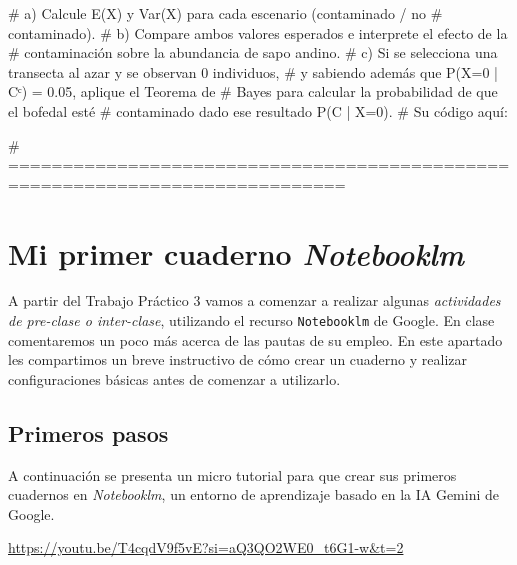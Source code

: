 \documentclass[
  spanish,
  letterpaper,
  DIV=11,
  numbers=noendperiod]{scrreprt}
\newenvironment{Shaded}{\begin{snugshade}}{\end{snugshade}}
\newcommand{\CommentTok}[1]{\textcolor[rgb]{0.37,0.37,0.37}{#1}}
\begin{document}
\begin{Shaded}
\begin{Highlighting}[]
\CommentTok{\#     a) Calcule E(X) y Var(X) para cada escenario (contaminado / no}
\CommentTok{\#        contaminado).}
\CommentTok{\#     b) Compare ambos valores esperados e interprete el efecto de la}
\CommentTok{\#        contaminación sobre la abundancia de sapo andino.}
\CommentTok{\#     c) Si se selecciona una transecta al azar y se observan 0 individuos,}
\CommentTok{\#        y sabiendo además que P(X=0 | Cᶜ) = 0.05, aplique el Teorema de}
\CommentTok{\#        Bayes para calcular la probabilidad de que el bofedal esté}
\CommentTok{\#        contaminado dado ese resultado P(C | X=0).}
\CommentTok{\# Su código aquí:}

\CommentTok{\# =============================================================================}
\end{Highlighting}
\end{Shaded}


\chapter*{\texorpdfstring{Mi primer cuaderno
\emph{Notebooklm}}{Mi primer cuaderno Notebooklm}}\label{mi-primer-cuaderno-notebooklm}


A partir del Trabajo Práctico 3 vamos a comenzar a realizar algunas
\emph{actividades de pre-clase o inter-clase}, utilizando el recurso
\texttt{Notebooklm} de Google. En clase comentaremos un poco más acerca
de las pautas de su empleo. En este apartado les compartimos un breve
instructivo de cómo crear un cuaderno y realizar configuraciones básicas
antes de comenzar a utilizarlo.

\section*{Primeros pasos}\label{primeros-pasos-1}


A continuación se presenta un micro tutorial para que crear sus primeros
cuadernos en \emph{Notebooklm}, un entorno de aprendizaje basado en la
IA Gemini de Google.

\url{https://youtu.be/T4cqdV9f5vE?si=aQ3QO2WE0_t6G1-w&t=2}
\end{document}

